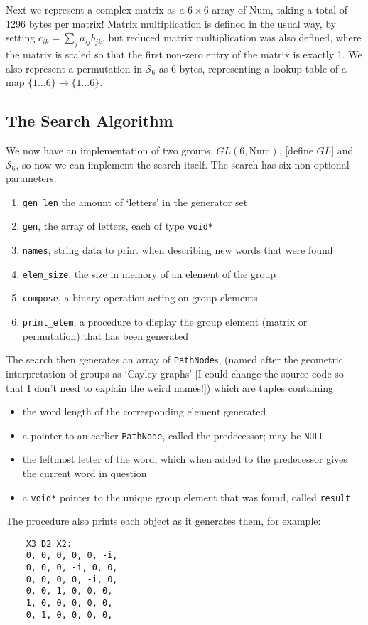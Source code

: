 Next we represent a complex matrix as a $6\times 6$ array of Num, taking a total of 1296 bytes per matrix! Matrix multiplication is defined in the usual way, by setting $c_{ik} = \sum_j a_{ij}b_{jk}$, but reduced matrix multiplication was also defined, where the matrix is scaled so that the first non-zero entry of the matrix is exactly 1. We also represent a permutation in $\mathcal{S}_6$ as 6 bytes, representing a lookup table of a map $\{1\dots 6\} \to \{1 \dots 6\}$.

\subsection{The Search Algorithm}
We now have an implementation of two groups, $GL(6, \text{Num})$, [define $GL$] and $\mathcal{S}_6$, so now we can implement the search itself. The search has six non-optional parameters:
\begin{enumerate}
	\item \verb`gen_len` the amount of `letters' in the generator set
	\item \verb`gen`, the array of letters, each of type \verb`void*`
	\item \verb`names`, string data to print when describing new words that were found
	\item \verb`elem_size`, the size in memory of an element of the group
	\item \verb`compose`, a binary operation acting on group elements
	\item \verb`print_elem`, a procedure to display the group element (matrix or permutation) that has been generated
\end{enumerate}
The search then generates an array of \verb`PathNode`s, (named after the geometric interpretation of groups as `Cayley graphs' [I could change the source code so that I don't need to explain the weird names!]) which are tuples containing
\begin{itemize}
	\item the word length of the corresponding element generated
	\item a pointer to an earlier \verb`PathNode`, called the predecessor; may be \verb`NULL`
	\item the leftmost letter of the word, which when added to the predecessor gives the current word in question
	\item a \verb`void*` pointer to the unique group element that was found, called \verb`result`
\end{itemize}
The procedure also prints each object as it generates them, for example:
\begin{verbatim}
	X3 D2 X2:
	0, 0, 0, 0, 0, -i, 
	0, 0, 0, -i, 0, 0, 
	0, 0, 0, 0, -i, 0, 
	0, 0, 1, 0, 0, 0, 
	1, 0, 0, 0, 0, 0, 
	0, 1, 0, 0, 0, 0, 
\end{verbatim}

